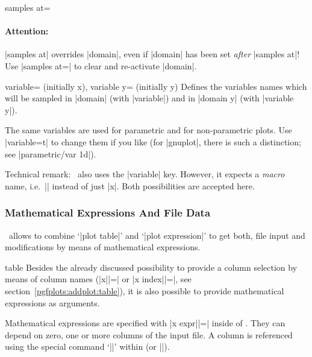 {\begin{pgfplotskey}{samples at=}
	\paragraph{Attention:} |samples at| overrides |domain|, even if |domain| has been set \emph{after} |samples at|! Use |samples at={}| to clear  and re-activate |domain|.
\end{pgfplotskey}

\begin{pgfplotskeylist}{%
	variable= (initially x),%
	variable y= (initially y)}
	Defines the variables names which will be sampled in |domain| (with |variable|) and in |domain y| (with |variable y|).

	The same variables are used for parametric and for non-parametric plots. Use |variable=t| to change them if you like (for |gnuplot|, there is such a distinction; see |parametric/var 1d|).

	Technical remark: \Tikz\ also uses the |variable| key. However, it expects a \emph{macro} name, i.e.\ |\x| instead of just |x|. Both possibilities are accepted here.
\end{pgfplotskeylist}

\subsubsection{Mathematical Expressions And File Data}
\PGFPlots\ allows to combine `|plot table|' and `|plot expression|' to get both, file input and modifications by means of mathematical expressions.

\begin{addplotoperation}[]{table}{}
\label{pgfplots:addplot:table:expr}
	Besides the already discussed possibility to provide a column selection by means of column names (|x||=| or |x index||=|, see section~\ref{pgfplots:addplot:table}), it is also possible to provide mathematical expressions as arguments.

	Mathematical expressions are specified with |x expr||=| inside of . They can depend on zero, one or more columns of the input file. A column is referenced using the special command `|\thisrow|' within  (or |\thisrowno|).

\begin{codeexample}[vbox]


\end{codeexample}
\end{addplotoperation}}
